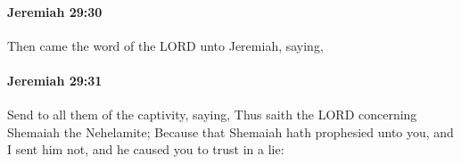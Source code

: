 		\paragraph{Jeremiah 29:30} %
			\label{JEREMIAH-29-30}

			Then came the word of the LORD unto Jeremiah, saying,


		\paragraph{Jeremiah 29:31} %
			\label{JEREMIAH-29-31}

			Send to all them of the captivity, saying, Thus saith the LORD concerning Shemaiah the Nehelamite; Because that Shemaiah hath prophesied unto you, and I sent him not, and he caused you to trust in a lie:


